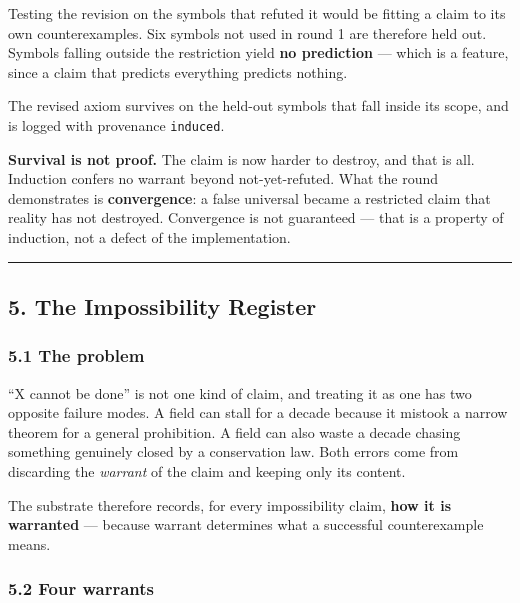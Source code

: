 \documentclass[
  11pt,
  a4paper,
]{article}
\begin{document}
Testing the revision on the symbols that refuted it would be fitting a
claim to its own counterexamples. Six symbols not used in round 1 are
therefore held out. Symbols falling outside the restriction yield
\textbf{no prediction} --- which is a feature, since a claim that
predicts everything predicts nothing.

The revised axiom survives on the held-out symbols that fall inside its
scope, and is logged with provenance \texttt{induced}.

\textbf{Survival is not proof.} The claim is now harder to destroy, and
that is all. Induction confers no warrant beyond not-yet-refuted. What
the round demonstrates is \textbf{convergence}: a false universal became
a restricted claim that reality has not destroyed. Convergence is not
guaranteed --- that is a property of induction, not a defect of the
implementation.

\begin{center}\rule{0.5\linewidth}{0.5pt}\end{center}

\subsection{5. The Impossibility
Register}\label{the-impossibility-register}

\subsubsection{5.1 The problem}\label{the-problem}

``X cannot be done'' is not one kind of claim, and treating it as one
has two opposite failure modes. A field can stall for a decade because
it mistook a narrow theorem for a general prohibition. A field can also
waste a decade chasing something genuinely closed by a conservation law.
Both errors come from discarding the \emph{warrant} of the claim and
keeping only its content.

The substrate therefore records, for every impossibility claim,
\textbf{how it is warranted} --- because warrant determines what a
successful counterexample means.

\subsubsection{5.2 Four warrants}\label{four-warrants}
\end{document}
